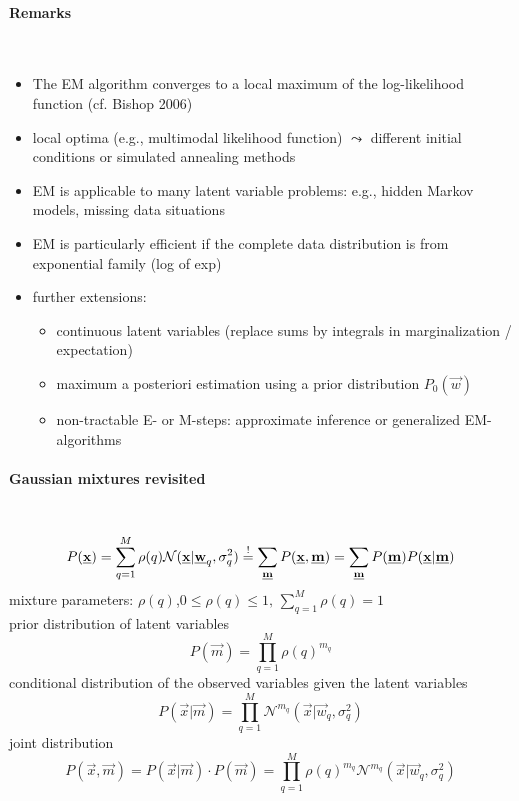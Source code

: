 \paragraph{Remarks}\mbox{}\\
\begin{itemize}
	\item The EM algorithm converges to a local maximum of the log-likelihood function (cf. Bishop 2006)
	\item local optima (e.g., multimodal likelihood function) $\leadsto$ different initial conditions or simulated annealing methods
	\item EM is applicable to many latent variable problems: e.g., hidden Markov models, missing data situations
	\item EM is particularly efficient if the complete data distribution is from exponential family (log of exp)
	\item further extensions:
	\begin{itemize}
		\item continuous latent variables (replace sums by integrals in marginalization / expectation)
		\item maximum a posteriori estimation using a prior distribution $P_0(\vec{w})$
		\item non-tractable E- or M-steps: approximate inference or generalized EM-algorithms
	\end{itemize}
\end{itemize}
\paragraph{Gaussian mixtures revisited}\mbox{}\\
\vspace{-3mm}
\begin{equation*}
P(\underline{\mathbf{x}}) = \sum_{q=1}^{M} \rho(q) \mathcal{N}(\underline{\mathbf{x}} | \underline{\mathbf{w}}_q, \sigma_q^2) \stackrel{\mathrm{!}}{=} \sum_{\underline{\mathbf{m}}} P(\underline{\mathbf{x}}, \underline{\mathbf{m}}) = \sum_{\underline{\mathbf{m}}} P(\underline{\mathbf{m}}) P(\underline{\mathbf{x}} | \underline{\mathbf{m}})
\end{equation*}
mixture parameters: $\rho(q)$,\quad $0 \leq \rho(q) \leq 1, \, \sum_{q=1}^{M} \rho(q) = 1$\\
\vspace{2mm}
prior distribution of latent variables 
\vspace{-1mm}
\begin{equation*}
 P(\vec{m}) = \prod_{q=1}^{M} \rho(q)^{m_q}
\end{equation*}
\vspace{2mm}
conditional distribution of the observed variables given the latent variables
\vspace{-1mm}
\begin{equation*}
P(\vec{x} | \vec{m}) = \prod_{q=1}^{M} \mathcal{N}^{m_q}(\vec{x} | \vec{w}_q, \sigma_q^2)
\end{equation*}
joint distribution 
\vspace{-1mm}
\begin{equation*}
P(\vec{x} , \vec{m}) = P(\vec{x} | \vec{m}) \cdot P(\vec{m}) = \prod\limits_{q=1}^{M} \rho(q)^{m_q} \mathcal{N}^{m_q}(\vec{x} | \vec{w}_q, \sigma_q^2)
\end{equation*}


